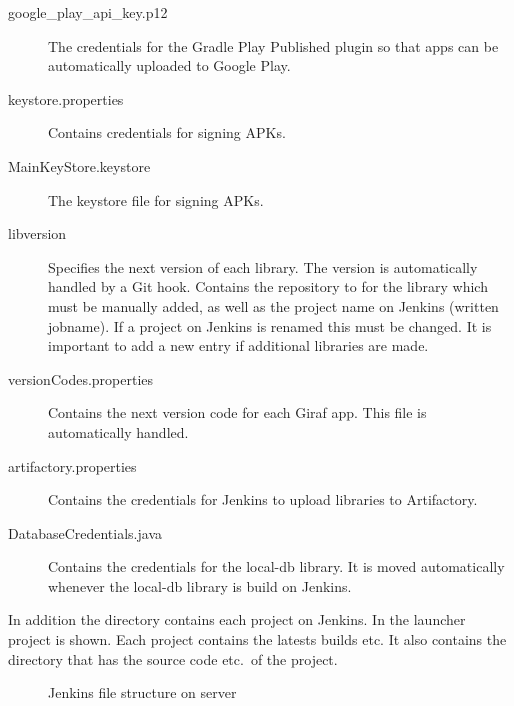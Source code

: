 \begin{description}
  \item[google\_play\_api\_key.p12] The credentials for the Gradle Play Published plugin so that apps can be automatically uploaded to Google Play.
  \item[keystore.properties] Contains credentials for signing APKs.
  \item[MainKeyStore.keystore] The keystore file for signing APKs.
  \item[libversion] Specifies the next version of each library. The version is automatically handled by a Git hook. Contains the repository to for the library which must be manually added, as well as the project name on Jenkins (written jobname). If a project on Jenkins is renamed this must be changed. It is important to add a new entry if additional libraries are made.
  \item[versionCodes.properties] Contains the next version code for each Giraf app. This file is automatically handled.
  \item[artifactory.properties] Contains the credentials for Jenkins to upload libraries to Artifactory.
  \item[DatabaseCredentials.java] Contains the credentials for the local-db library. It is moved automatically whenever the local-db library is build on Jenkins.
\end{description}

In addition the  directory contains each project on Jenkins. In  the launcher project is shown. Each project contains the latests builds etc. It also contains the  directory that has the source code etc.\ of the project.

\begin{figure}
\caption{Jenkins file structure on server} \label{fig:jenkins_file_structure}
\end{figure}